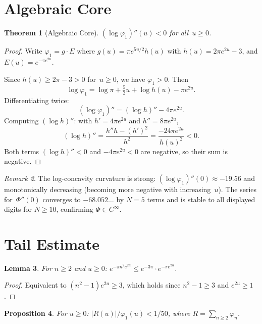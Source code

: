 \documentclass[11pt]{article}
\newtheorem{theorem}{Theorem}
\newtheorem{lemma}[theorem]{Lemma}
\newtheorem{proposition}[theorem]{Proposition}
\theoremstyle{definition}
\theoremstyle{remark}
\newtheorem{remark}[theorem]{Remark}
\begin{document}
\section{Algebraic Core}
\label{sec:algebraic}

\begin{theorem}[Algebraic Core]\label{thm:algebraic}
$(\log\varphi_1)''(u) < 0$ for all~$u \geq 0$.
\end{theorem}

\begin{proof}
Write $\varphi_1 = g \cdot E$ where $g(u) = \pi e^{5u/2}h(u)$ with $h(u) = 2\pi e^{2u} - 3$, and $E(u) = e^{-\pi e^{2u}}$.

Since $h(u) \geq 2\pi - 3 > 0$ for~$u \geq 0$, we have $\varphi_1 > 0$. Then
\[
\log\varphi_1 = \log\pi + \tfrac{5}{2}u + \log h(u) - \pi e^{2u}.
\]
Differentiating twice:
\[
(\log\varphi_1)'' = (\log h)'' - 4\pi e^{2u}.
\]
Computing $(\log h)''$: with $h' = 4\pi e^{2u}$ and $h'' = 8\pi e^{2u}$,
\[
(\log h)'' = \frac{h''h - (h')^2}{h^2} = \frac{-24\pi e^{2u}}{h(u)^2} < 0.
\]
Both terms $(\log h)'' < 0$ and $-4\pi e^{2u} < 0$ are negative, so their sum is negative.
\end{proof}

\begin{remark}
The log-concavity curvature is strong: $(\log\varphi_1)''(0) \approx -19.56$ and monotonically decreasing (becoming more negative with increasing~$u$). The series for~$\Phi''(0)$ converges to $-68.052\ldots$ by $N = 5$ terms and is stable to all displayed digits for $N \geq 10$, confirming $\Phi \in C^\infty$.
\end{remark}

\section{Tail Estimate}
\label{sec:tail}

\begin{lemma}\label{lem:tail_decay}
For $n \geq 2$ and $u \geq 0$: $e^{-\pi n^2 e^{2u}} \leq e^{-3\pi}\cdot e^{-\pi e^{2u}}$.
\end{lemma}

\begin{proof}
Equivalent to $(n^2 - 1)e^{2u} \geq 3$, which holds since $n^2 - 1 \geq 3$ and $e^{2u} \geq 1$.
\end{proof}

\begin{proposition}\label{prop:tail_ratio}
For $u \geq 0$: $|R(u)|/\varphi_1(u) < 1/50$, where $R = \sum_{n\geq 2}\varphi_n$.
\end{proposition}
\end{document}
